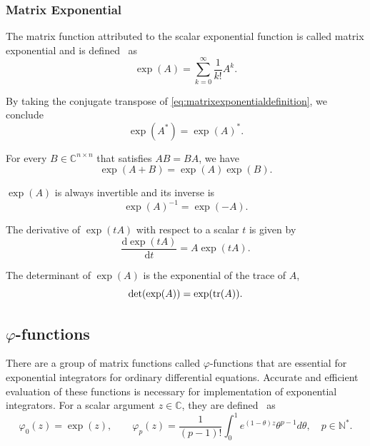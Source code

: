 \subsubsection*{Matrix Exponential}
The matrix function attributed to the scalar exponential function is called matrix exponential and
is defined~\cite{higham2008functions} as
\begin{equation}
    \label{eq:matrixexponentialdefinition}
    \exp(A) = \sum_{k=0}^{\infty}{\frac{1}{k!} A^k}.
\end{equation}

By taking the conjugate transpose of \eqref{eq:matrixexponentialdefinition}, we conclude
\begin{equation}
    \exp(A^{*}) = \exp(A)^{*}.
\end{equation}

For every $B \in \mathbb{C}^{n \times n}$ that satisfies $AB = BA$, we have
\begin{equation}
    \exp(A + B) = \exp(A) \exp(B).
\end{equation}

$\exp(A)$ is always invertible and its inverse is
\begin{equation}
    \exp(A)^{-1} = \exp(-A).
\end{equation}

The derivative of $\exp(tA)$ with respect to a scalar $t$ is given by
\begin{equation}
    \frac{\mathrm{d} \exp(tA)}{\mathrm{d} t} = A \exp(tA).
\end{equation}

The determinant of $\exp(A)$ is the exponential of the trace of $A$,
\begin{equation}
    \det(\exp(A)) = \exp(\trace(A)).
\end{equation}

\subsection{\texorpdfstring{$\varphi$}{Phi}-functions}
There are a group of matrix functions called $\varphi$-functions that are essential
for exponential integrators for ordinary differential equations. Accurate and efficient
evaluation of these functions is necessary for implementation of exponential integrators.
For a scalar argument $z \in \mathbb{C}$, they are defined~\cite{higham2008functions} as
\begin{equation}
    \label{eq:scalarphifunctionsdefinition}
    \varphi_0(z) = \exp(z), \qquad
    \varphi_p(z) = \frac{1}{(p-1)!} \int_{0}^{1}{e^{(1 - \theta)z} \theta^{p-1} d\theta},
    \quad p \in \mathbb{N^*}.
\end{equation}

